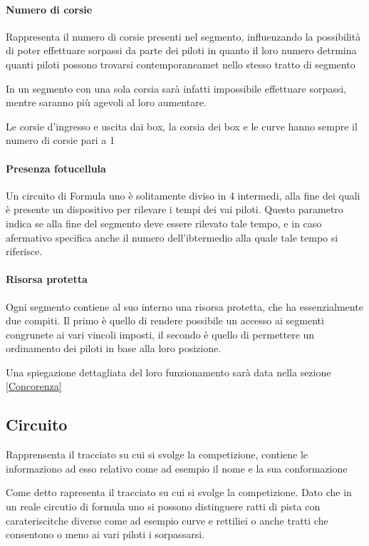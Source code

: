 \documentclass[a4paper,11pt, twoside]{book}
\begin{document}
	\paragraph{Numero di corsie}
	  Rappresenta il numero di corsie presenti nel segmento, influenzando la possibilità
	  di poter effettuare sorpassi da parte dei piloti in quanto il loro numero detrmina quanti piloti possono trovarsi
	  contemporaneamet nello stesso tratto di segmento
	  
	  In un segmento con una sola corsia sarà infatti impossibile effettuare sorpassi, mentre saranno più agevoli
	  al loro aumentare.
	  
	  Le corsie d'ingresso e uscita dai box, la corsia dei box e le curve hanno sempre il numero di corsie pari
	  a 1
	  
	\paragraph{Presenza fotucellula}
	  Un circuito di Formula uno è solitamente diviso in 4 intermedi, alla fine dei quali
	  è presente un dispositivo per rilevare i tempi dei vai piloti. Questo parametro
	  indica se alla fine del segmento deve essere rilevato tale tempo, e in caso afermativo
	  specifica anche il numero dell'ibtermedio alla quale tale tempo si riferisce.
	

	\paragraph{Risorsa protetta}
	  Ogni segmento contiene al suo interno una risorsa protetta, che ha essenzialmente due compiti. Il primo
	  è quello di rendere possibile un accesso ai segmenti congrunete ai vari vincoli imposti, 
	  il secondo è quello di permettere un ordinamento dei piloti in base alla loro posizione.
	  
	  Una spiegazione dettagliata del loro funzionamento sarà data nella sezione \ref{Concorenza}
	  
      \subsection{Circuito}
	Rapprensenta il tracciato su cui si svolge la competizione, contiene le informaziono ad esso relativo come
	ad esempio il nome e la sua conformazione
	
        Come detto rapresenta il tracciato su cui si svolge la competizione. Dato che in un reale circutio di formula uno
	si possono distinguere ratti di pista con carateriscitche diverse come ad esempio curve e rettiliei o anche
	tratti che consentono o meno ai vari piloti i sorpassarsi.
	
\end{document}
